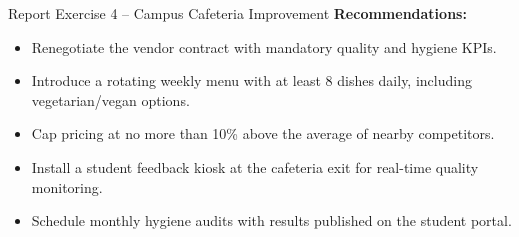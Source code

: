 \documentclass[12pt,a4paper]{article}
\begin{document}
\begin{exbox}{Report Exercise 4 -- Campus Cafeteria Improvement}
\textbf{Recommendations:}
\begin{itemize}[noitemsep]
    \item Renegotiate the vendor contract with mandatory quality and hygiene KPIs.
    \item Introduce a rotating weekly menu with at least 8 dishes daily, including vegetarian/vegan options.
    \item Cap pricing at no more than 10\% above the average of nearby competitors.
    \item Install a student feedback kiosk at the cafeteria exit for real-time quality monitoring.
    \item Schedule monthly hygiene audits with results published on the student portal.
\end{itemize}
\end{exbox}
\end{document}
